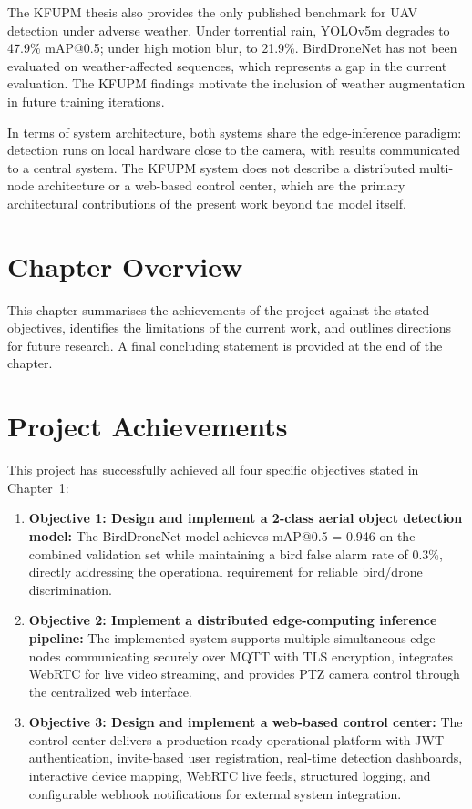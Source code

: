 \documentclass[12pt,a4paper]{report}
\begin{document}
The KFUPM thesis also provides the only published benchmark for UAV
detection under adverse weather. Under torrential rain, YOLOv5m degrades
to 47.9\% mAP@0.5; under high motion blur, to 21.9\%. BirdDroneNet
has not been evaluated on weather-affected sequences, which represents
a gap in the current evaluation. The KFUPM findings motivate the
inclusion of weather augmentation in future training iterations.

In terms of system architecture, both systems share the edge-inference
paradigm: detection runs on local hardware close to the camera, with
results communicated to a central system. The KFUPM system does not
describe a distributed multi-node architecture or a web-based control
center, which are the primary architectural contributions of the present
work beyond the model itself.

\section{Chapter Overview}

This chapter summarises the achievements of the project against the stated
objectives, identifies the limitations of the current work, and outlines
directions for future research. A final concluding statement is provided
at the end of the chapter.

\section{Project Achievements}

This project has successfully achieved all four specific objectives stated in Chapter~1:

\begin{enumerate}
  \item \textbf{Objective 1: Design and implement a 2-class aerial object
        detection model:} The BirdDroneNet model achieves mAP@0.5 = 0.946
        on the combined validation set while maintaining a bird false alarm rate of 0.3\%,
        directly addressing the operational requirement for reliable bird/drone discrimination.
  
  \item \textbf{Objective 2: Implement a distributed edge-computing
        inference pipeline:} The implemented system supports multiple simultaneous
        edge nodes communicating securely over MQTT with TLS encryption, integrates
        WebRTC for live video streaming, and provides PTZ camera control through
        the centralized web interface.
  
  \item \textbf{Objective 3: Design and implement a web-based control
        center:} The control center delivers a production-ready operational platform
        with JWT authentication, invite-based user registration, real-time detection
        dashboards, interactive device mapping, WebRTC live feeds, structured logging,
        and configurable webhook notifications for external system integration.
\end{enumerate}
\end{document}
